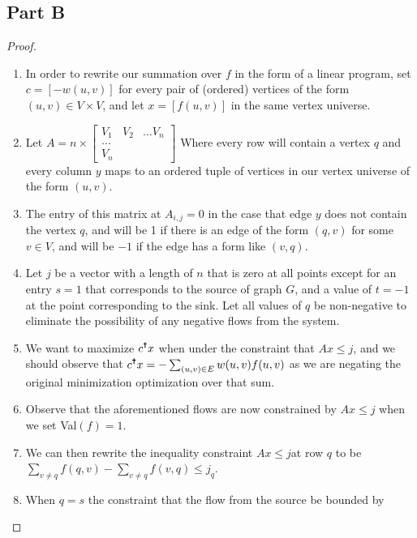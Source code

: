 \documentclass{article}
\begin{document}
\subsection{Part B}
\begin{proof}
\begin{enumerate}
      \item In order to rewrite our summation over \(f\) in the form of a linear program,
      set \(c = [-w(u,v)]\) for every pair of (ordered) vertices of the form \((u,v) \in V
      \times V\), and let \(x = [f(u,v)]\) in the same vertex universe.
      \item Let \(A = n \times \begin{bmatrix}
            V_1 & V_2 & \ldots V_n \\
            \ldots \\
            V_n
      \end{bmatrix}\) Where every row will contain a vertex \(q\) and every column \(y\)
      maps to an ordered tuple of vertices in our vertex universe of the form \((u,v)\).
      \item The entry of this matrix at \(A_{i,j} = 0\) in the case that edge \(y\) does
      not contain the vertex \(q\), and will be 1 if there is an edge of the form
      \((q,v)\) for some \(v \in V\), and will be \(-1\) if the edge has a form like
      \((v,q)\). 
      \item Let \(j\) be a vector with a length of \(n\) that is zero at all points except
      for an entry \(s = 1\) that corresponds to the source of graph \(G\), and a value of
      \(t= -1\) at the point corresponding to the sink. Let all values of \(q\) be
      non-negative to eliminate the possibility of any negative flows from the system. 
      \item We want to maximize \(c^{\text{\Cross{}}}x\) when under the constraint that
      \(Ax \leq j\), and we should observe that \(c^{\text{\Cross{}}}x = - \sum_{(u,v)\in
      E} w(u,v) f(u,v)\) as we are negating the original minimization optimization over
      that sum. 
      \item Observe that the aforementioned flows are now constrained by \(Ax\leq j\) when
      we set Val\((f) = 1\).
      \item We can then rewrite the inequality constraint \(Ax \leq j\)at row \(q\) to be
      \(\sum_{v \neq q} f(q, v) - \sum_{v \neq q} f (v,q)\leq j_q\). 
      \item When \(q = s\) the constraint that the flow from the source be bounded by

\end{enumerate}
\end{proof}
\end{document}
